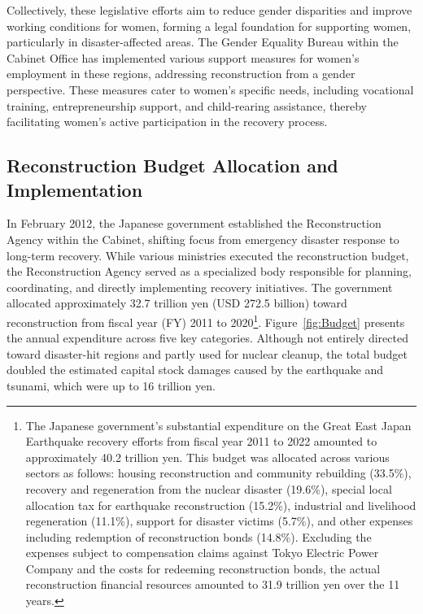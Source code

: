 \documentclass[a4paper,12pt]{article}
\begin{document}
Collectively, these legislative efforts aim to reduce gender disparities and improve working conditions for women, forming a legal foundation for supporting women, particularly in disaster-affected areas. The Gender Equality Bureau within the Cabinet Office has implemented various support measures for women's employment in these regions, addressing reconstruction from a gender perspective. These measures cater to women's specific needs, including vocational training, entrepreneurship support, and child-rearing assistance, thereby facilitating women's active participation in the recovery process.


\subsection{Reconstruction Budget Allocation and Implementation}

In February 2012, the Japanese government established the Reconstruction Agency within the Cabinet, shifting focus from emergency disaster response to long-term recovery. While various ministries executed the reconstruction budget, the Reconstruction Agency served as a specialized body responsible for planning, coordinating, and directly implementing recovery initiatives. The government allocated approximately 32.7 trillion yen (USD 272.5 billion) toward reconstruction from fiscal year (FY) 2011 to 2020\footnote{The Japanese government's substantial expenditure on the Great East Japan Earthquake recovery efforts from fiscal year 2011 to 2022 amounted to approximately 40.2 trillion yen. This budget was allocated across various sectors as follows: housing reconstruction and community rebuilding (33.5\%), recovery and regeneration from the nuclear disaster (19.6\%), special local allocation tax for earthquake reconstruction (15.2\%), industrial and livelihood regeneration (11.1\%), support for disaster victims (5.7\%), and other expenses including redemption of reconstruction bonds (14.8\%). Excluding the expenses subject to compensation claims against Tokyo Electric Power Company and the costs for redeeming reconstruction bonds, the actual reconstruction financial resources amounted to 31.9 trillion yen over the 11 years.}. Figure~\ref{fig:Budget} presents the annual expenditure across five key categories. Although not entirely directed toward disaster-hit regions and partly used for nuclear cleanup, the total budget doubled the estimated capital stock damages caused by the earthquake and tsunami, which were up to 16 trillion yen.
\end{document}
